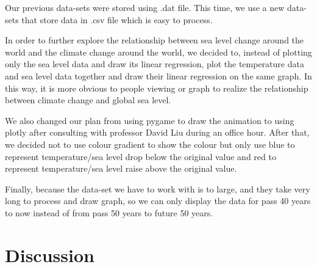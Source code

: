 \documentclass[fontsize=11pt]{article}
\begin{document}
   \item
   Our previous data-sets were stored using .dat file. This time, we use a new data-sets that store data in .csv file which is easy to process.\\
   
   \item
   In order to further explore the relationship between sea level change around the world and the climate change around the world, we decided to, instead of plotting only the sea level data and draw its linear regression, plot the temperature data and sea level data together and draw their linear regression on the same graph. In this way, it is more obvious to people viewing or graph to realize the relationship between climate change and global sea level.\\
   
   \item
   We also changed our plan from using pygame to draw the animation to using plotly after consulting with professor David Liu during an office hour. 
   After that, we decided not to use colour gradient to show the colour but only use blue to represent temperature/sea level drop below the original value and red to represent temperature/sea level raise above the original value.
   
   \item
   Finally, because the data-set we have to work with is to large, and they take very long to process and draw graph, so we can only display the data for pass 40 years to now instead of from pass 50 years to future 50 years.
   
    \section*{Discussion}
\end{document}
